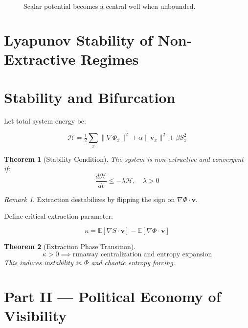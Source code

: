 \documentclass[11pt,a4paper]{article}
\theoremstyle{plain}
\newtheorem{theorem}{Theorem}[section]
\theoremstyle{definition}
\theoremstyle{remark}
\newtheorem{remark}{Remark}[section]
\newcommand{\vvec}{\mathbf{v}}
\newcommand{\Entropy}{S}
\begin{document}
\begin{figure}[H]
\centering
{}
\caption{Scalar potential becomes a central well when unbounded.}
\end{figure}

\section{Lyapunov Stability of Non-Extractive Regimes}

\section{Stability and Bifurcation}

Let total system energy be:

\[
\mathcal{H} = \tfrac12 \sum_x \|\nabla\Phi_x\|^2 + \alpha \|\vvec_x\|^2 + \beta \Entropy_x^2
\]

\begin{theorem}[Stability Condition]
The system is non-extractive and convergent if:
\[
\frac{d\mathcal{H}}{dt} \le -\lambda \mathcal{H}, \quad \lambda > 0
\]
\end{theorem}

\begin{remark}
Extraction destabilizes by flipping the sign on $\nabla\Phi \cdot \vvec$.
\end{remark}

Define critical extraction parameter:

\[
\kappa = \mathbb{E}[\nabla\Entropy \cdot \vvec] - \mathbb{E}[\nabla\Phi \cdot \vvec]
\]

\begin{theorem}[Extraction Phase Transition]
\[
\kappa > 0 \implies \text{runaway centralization and entropy expansion}
\]
This induces instability in $\Phi$ and chaotic entropy forcing.
\end{theorem}

\newpage

\section*{Part II — Political Economy of Visibility}
\end{document}
